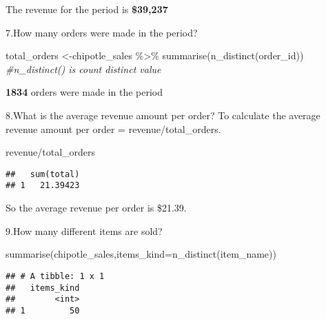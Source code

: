 \documentclass[
]{article}
\newenvironment{Shaded}{\begin{snugshade}}{\end{snugshade}}
\newcommand{\AttributeTok}[1]{\textcolor[rgb]{0.77,0.63,0.00}{#1}}
\newcommand{\CommentTok}[1]{\textcolor[rgb]{0.56,0.35,0.01}{\textit{#1}}}
\newcommand{\FunctionTok}[1]{\textcolor[rgb]{0.00,0.00,0.00}{#1}}
\newcommand{\NormalTok}[1]{#1}
\newcommand{\OtherTok}[1]{\textcolor[rgb]{0.56,0.35,0.01}{#1}}
\newcommand{\SpecialCharTok}[1]{\textcolor[rgb]{0.00,0.00,0.00}{#1}}
\begin{document}
The revenue for the period is \textbf{\$39,237}

7.How many orders were made in the period?

\begin{Shaded}
\begin{Highlighting}[]
\NormalTok{total\_orders }\OtherTok{\textless{}{-}}\NormalTok{chipotle\_sales }\SpecialCharTok{\%\textgreater{}\%} \FunctionTok{summarise}\NormalTok{(}\FunctionTok{n\_distinct}\NormalTok{(order\_id)) }\CommentTok{\#n\_distinct() is count distinct value}
\end{Highlighting}
\end{Shaded}

\textbf{1834} orders were made in the period

8.What is the average revenue amount per order? To calculate the average
revenue amount per order = revenue/total\_orders.

\begin{Shaded}
\begin{Highlighting}[]
\NormalTok{revenue}\SpecialCharTok{/}\NormalTok{total\_orders}
\end{Highlighting}
\end{Shaded}

\begin{verbatim}
##   sum(total)
## 1   21.39423
\end{verbatim}

So the average revenue per order is \$21.39.

9.How many different items are sold?

\begin{Shaded}
\begin{Highlighting}[]
\FunctionTok{summarise}\NormalTok{(chipotle\_sales,}\AttributeTok{items\_kind=}\FunctionTok{n\_distinct}\NormalTok{(item\_name))}
\end{Highlighting}
\end{Shaded}

\begin{verbatim}
## # A tibble: 1 x 1
##   items_kind
##        <int>
## 1         50
\end{verbatim}
\end{document}
